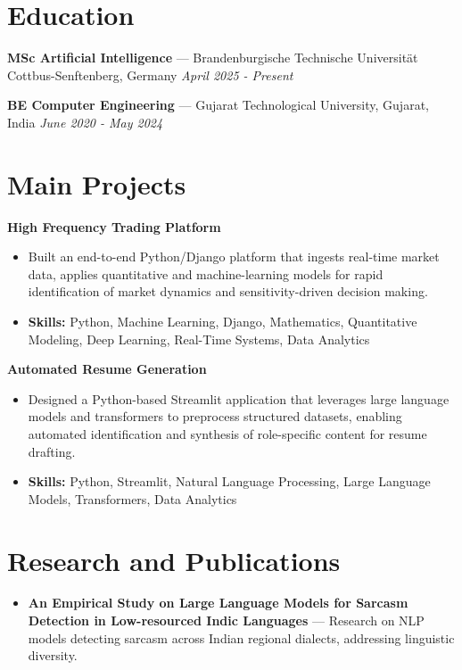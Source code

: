 \documentclass[a4paper,10pt]{article}
\begin{document}
\section*{Education}
\textbf{MSc Artificial Intelligence} — Brandenburgische Technische Universität Cottbus-Senftenberg, Germany \hfill \textit{April 2025 - Present}\par
\vspace{1.5pt}
\textbf{BE Computer Engineering} — Gujarat Technological University, Gujarat, India \hfill \textit{June 2020 - May 2024}\par

\section*{Main Projects}
\textbf{High Frequency Trading Platform}\par
\vspace{1pt}
\begin{itemize}
  \item Built an end-to-end Python/Django platform that ingests real-time market data, applies quantitative and machine-learning models for rapid identification of market dynamics and sensitivity-driven decision making.
  \item \textbf{Skills:} Python, Machine Learning, Django, Mathematics, Quantitative Modeling, Deep Learning, Real-Time Systems, Data Analytics
\end{itemize}
\vspace{3pt}
\textbf{Automated Resume Generation}\par
\vspace{1pt}
\begin{itemize}
  \item Designed a Python-based Streamlit application that leverages large language models and transformers to preprocess structured datasets, enabling automated identification and synthesis of role-specific content for resume drafting.
  \item \textbf{Skills:} Python, Streamlit, Natural Language Processing, Large Language Models, Transformers, Data Analytics
\end{itemize}

\section*{Research and Publications}
\begin{itemize}
\item \textbf{An Empirical Study on Large Language Models for Sarcasm Detection in Low-resourced Indic Languages} — Research on NLP models detecting sarcasm across Indian regional dialects, addressing linguistic diversity.
\end{itemize}
\end{document}
